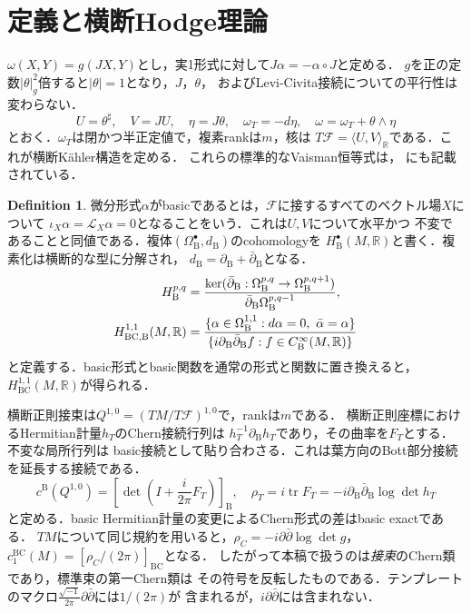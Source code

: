 \documentclass[12pt]{amsart}
\theoremstyle{definition}
\newtheorem{defn}[thm]{Definition}
\theoremstyle{remark}
\numberwithin{equation}{section}
\DeclareMathOperator{\tr}{tr}
\newcommand{\cF}{\mathcal{F}}
\newcommand{\cL}{\mathcal{L}}
\newcommand{\ddbar}{\frac{\sqrt{-1}}{2\pi} \partial \bar{\partial}}
\newcommand{\R}{\mathbb{R}}
\newcommand{\BC}{\mathrm{BC}}
\newcommand{\bas}{\mathrm{B}}
\newcommand{\wt}{\omega_{T}}
\newcommand{\rhoT}{\rho_{T}}
\newcommand{\rhoC}{\rho_{C}}
\begin{document}
\section{定義と横断Hodge理論}\label{sec:defs}
$\omega(X,Y)=g(JX,Y)$とし，実1形式に対して$J\alpha=-\alpha\circ J$と定める．
$g$を正の定数$|\theta|_g^2$倍すると$|\theta|=1$となり，$J$，$\theta$，
およびLevi-Civita接続についての平行性は変わらない．
\begin{equation}\label{eq:vaisman}
U=\theta^\sharp,\quad V=JU,\quad\eta=J\theta,
\quad\wt=-d\eta,\quad \omega=\wt+\theta\wedge\eta
\end{equation}
とおく．$\wt$は閉かつ半正定値で，複素rankは$m$，核は
$T\cF=\langle U,V\rangle_{\R}$である．これが横断K\"ahler構造を定める．
これらの標準的なVaisman恒等式は\cite[Section 2.1]{Istrati}，
\cite[Theorem 2.2]{IO}にも記載されている．

\begin{defn}\label{def:basic}
微分形式$\alpha$がbasicであるとは，$\cF$に接するすべてのベクトル場$X$について
$\iota_X\alpha=\cL_X\alpha=0$となることをいう．これは$U,V$について水平かつ
不変であることと同値である．複体$(\Omega_{\bas}^{\bullet},d_{\bas})$のcohomologyを
$H_{\bas}^{\bullet}(M,\R)$と書く．複素化は横断的な型に分解され，
$d_{\bas}=\partial_{\bas}+\bar\partial_{\bas}$となる．
\begin{align}\label{eq:cohomdef}
H_{\bas}^{p,q}&=\frac{\ker(\bar\partial_{\bas}:\Omega_{\bas}^{p,q}
\to\Omega_{\bas}^{p,q+1})}{\bar\partial_{\bas}\Omega_{\bas}^{p,q-1}},\\
H_{\BC,\bas}^{1,1}(M,\R)&=
\frac{\{\alpha\in\Omega_{\bas}^{1,1}:d\alpha=0,\ \bar\alpha=\alpha\}}
{\{i\partial_{\bas}\bar\partial_{\bas}f:f\in C^\infty_{\bas}(M,\R)\}}
\notag
\end{align}
と定義する．basic形式とbasic関数を通常の形式と関数に置き換えると，
$H_{\BC}^{1,1}(M,\R)$が得られる．
\end{defn}

横断正則接束は$Q^{1,0}=(TM/T\cF)^{1,0}$で，rankは$m$である．
横断正則座標におけるHermitian計量$h_T$のChern接続行列は
$h_T^{-1}\partial_{\bas}h_T$であり，その曲率を$F_T$とする．不変な局所行列は
basic接続として貼り合わさる．これは葉方向のBott部分接続を延長する接続である．
\begin{equation}\label{eq:chern}
c^{\bas}(Q^{1,0})=
\left[\det\left(I+\frac{i}{2\pi}F_T\right)\right]_{\bas},
\quad \rhoT=i\tr F_T=-i\partial_{\bas}\bar\partial_{\bas}\log\det h_T
\end{equation}
と定める．basic Hermitian計量の変更によるChern形式の差はbasic exactである．
$TM$について同じ規約を用いると，$\rhoC=-i\partial\bar\partial\log\det g$，
$c_1^{\BC}(M)=[\rhoC/(2\pi)]_{\BC}$となる．
したがって本稿で扱うのは\emph{接束}のChern類であり，標準束の第一Chern類は
その符号を反転したものである．テンプレートのマクロ$\ddbar$には$1/(2\pi)$が
含まれるが，$i\partial\bar\partial$には含まれない．
\end{document}
